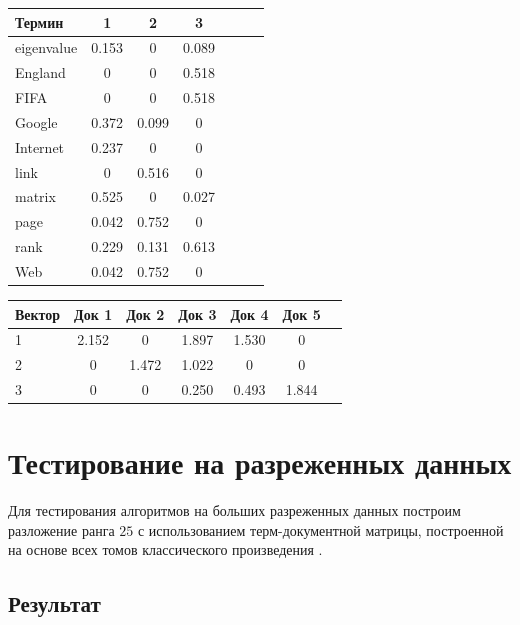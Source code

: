 \begin{center}
 \begin{tabular}{ l | c c c c c c }
 Термин      & 1 & 2 & 3 \\
 \hline
 eigenvalue  & 0.153  &   0  &   0.089 \\
 England     & 0  &   0  &   0.518 \\
 FIFA        & 0  &   0  &   0.518 \\
 Google      & 0.372  &   0.099  &   0 \\
 Internet    & 0.237  &   0  &   0 \\
 link        & 0  &   0.516  &   0 \\
 matrix      & 0.525  &  	0  &   0.027 \\
 page        & 0.042  &   0.752  &   0 \\
 rank        & 0.229  &   0.131  &   0.613 \\
 Web         & 0.042  &   0.752  &   0
\end{tabular}
\end{center}

\begin{center}
 \begin{tabular}{ l | c c c c c c }
 Вектор      & Док 1 & Док 2 & Док 3 & Док 4 & Док 5 \\
 \hline
 1           & 2.152  &   0  &   1.897  &   1.530  &  0 \\
 2           & 0  &   1.472  &   1.022  &   0  &   0 \\
 3           & 0  &   0  &   0.250  &   0.493  &   1.844 \\
\end{tabular}
\end{center}




\newpage





\section{Тестирование на разреженных данных}

Для тестирования алгоритмов на больших разреженных данных
построим разложение ранга $25$ с использованием терм-документной матрицы,
построенной на основе всех томов классического произведения .



\subsection{Результат}



